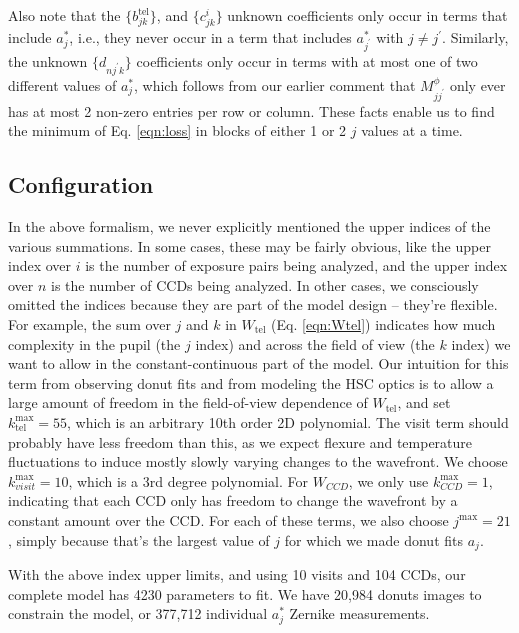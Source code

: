 \documentclass{article}
\begin{document}
Also note that the $\{b^\mathrm{tel}_{jk}\}$, and $\{c^i_{jk}\}$ unknown
coefficients only occur in terms that include $a_j^\ast$, i.e., they never occur
in a term that includes $a_{j^\prime}^\ast$ with $j \ne j^\prime$.  Similarly,
the unknown $\{d_{n j^\prime k}\}$ coefficients only occur in terms with at most
one of two different values of $a_j^\ast$, which follows from our earlier
comment that $M^\phi_{j j^\prime}$ only ever has at most 2 non-zero entries per
row or column.  These facts enable us to find the minimum of Eq. \ref{eqn:loss}
in blocks of either 1 or 2 $j$ values at a time.

\subsection{Configuration}

In the above formalism, we never explicitly mentioned the upper indices of the
various summations.  In some cases, these may be fairly obvious, like the upper
index over $i$ is the number of exposure pairs being analyzed, and the upper
index over $n$ is the number of CCDs being analyzed.  In other cases, we
consciously omitted the indices because they are part of the model design --
they're flexible.  For example, the sum over $j$ and $k$ in $W_\mathrm{tel}$
(Eq. \ref{eqn:Wtel}) indicates how much complexity in the pupil (the $j$ index)
and across the field of view (the $k$ index) we want to allow in the
constant-continuous part of the model.  Our intuition for this term from
observing donut fits and from modeling the HSC optics is to allow a large amount
of freedom in the field-of-view dependence of $W_\mathrm{tel}$, and set
$k^\mathrm{max}_\mathrm{tel} = 55$, which is an arbitrary 10th order 2D
polynomial.  The visit term should probably have less freedom than this, as we
expect flexure and temperature fluctuations to induce mostly slowly varying
changes to the wavefront.  We choose $k^\mathrm{max}_{visit} = 10$, which is a
3rd degree polynomial.  For $W_{CCD}$, we only use $k^\mathrm{max}_{CCD} = 1$,
indicating that each CCD only has freedom to change the wavefront by a constant
amount over the CCD.  For each of these terms, we also choose $j^\mathrm{max} =
21$, simply because that's the largest value of $j$ for which we made donut fits
$a_j$.

With the above index upper limits, and using 10 visits and 104 CCDs, our
complete model has 4230 parameters to fit.  We have 20,984 donuts images to
constrain the model, or 377,712 individual $a_j^\ast$ Zernike measurements.
\end{document}
